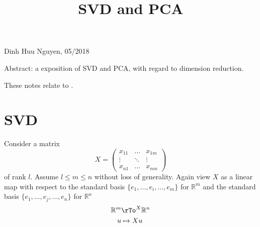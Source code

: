 \documentclass[12pt]{amsart}
\title{SVD and PCA}
\theoremstyle{definition}
\begin{document}
\maketitle

\begin{center}
Dinh Huu Nguyen, 05/2018
\end{center}
\vspace{20pt}

Abstract: a exposition of SVD and PCA, with regard to dimension reduction.
\vspace{20pt}

\tableofcontents

These notes relate to \cite{LowRankDecompositionDimensionReduction}.
\section{SVD} Consider a matrix
$$X = \left( \begin{array}{ccc} x_{11} & \dots & x_{1m} \\ \vdots & \ddots & \vdots \\ x_{n1} & \dots & x_{nm} \end{array} \right)$$
of rank $l$. Assume $l \leq m \leq n$ without loss of generality. Again view $X$ as a linear map with respect to the standard basis $\{e_1, \dots , e_i, \dots , e_m\}$ for $\mathbb{R}^m$ and the standard basis $\{e_1, \dots , e_j, \dots , e_n\}$ for $\mathbb{R}^n$
\begin{align*}
\mathbb{R}^m & \rTo^X \mathbb{R}^n \\
u & \mapsto Xu \\
\end{align*}
\end{document}
